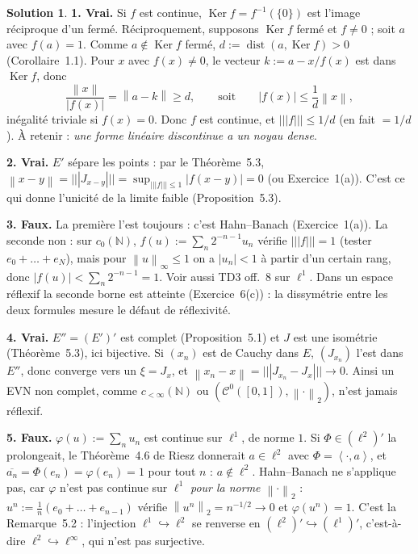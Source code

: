 \documentclass[11pt,a4paper]{article}
\newcommand{\N}{\mathbb{N}}
\newcommand{\dist}{\operatorname{dist}}
\newcommand{\norm}[1]{\left\|#1\right\|}
\newcommand{\opnorm}[1]{|\!|\!|#1|\!|\!|}
\newcommand{\ps}[2]{\left\langle #1,#2\right\rangle}
\newcommand{\Cz}{\mathcal{C}^0}
\newcommand{\ie}{c'est-à-dire}
\DeclareMathOperator{\Ker}{Ker}
\theoremstyle{definition}
\newtheorem*{solution}{Solution}
\begin{document}
\begin{solution}
\noindent\textbf{1. Vrai.} Si $f$ est continue, $\Ker f=f^{-1}(\{0\})$ est l'image réciproque d'un fermé. Réciproquement, supposons $\Ker f$ fermé et $f\ne0$ ; soit $a$ avec $f(a)=1$. Comme $a\notin\Ker f$ fermé, $d:=\dist(a,\Ker f)>0$ (Corollaire~1.1). Pour $x$ avec $f(x)\ne0$, le vecteur $k:=a-x/f(x)$ est dans $\Ker f$, donc
\[
\frac{\norm x}{|f(x)|}=\norm{a-k}\ge d,\qquad\text{soit}\qquad|f(x)|\le\frac1d\norm x ,
\]
inégalité triviale si $f(x)=0$. Donc $f$ est continue, et $\opnorm f\le1/d$ (en fait $=1/d$). À retenir : \emph{une forme linéaire discontinue a un noyau dense}.

\medskip
\noindent\textbf{2. Vrai.} $E'$ sépare les points : par le Théorème~5.3, $\norm{x-y}=\opnorm{J_{x-y}}=\sup_{\opnorm f\le1}|f(x-y)|=0$ (ou Exercice~1(a)). C'est ce qui donne l'unicité de la limite faible (Proposition~5.3).

\medskip
\noindent\textbf{3. Faux.} La première l'est toujours : c'est Hahn--Banach (Exercice~1(a)). La seconde non : sur $c_0(\N)$, $f(u):=\sum_n2^{-n-1}u_n$ vérifie $\opnorm f=1$ (tester $e_0+\dots+e_N$), mais pour $\norm u_\infty\le1$ on a $|u_n|<1$ à partir d'un certain rang, donc $|f(u)|<\sum_n2^{-n-1}=1$. Voir aussi TD3 off.~8 sur $\ell^1$. Dans un espace réflexif la seconde borne est atteinte (Exercice~6(c)) : la dissymétrie entre les deux formules mesure le défaut de réflexivité.

\medskip
\noindent\textbf{4. Vrai.} $E''=(E')'$ est complet (Proposition~5.1) et $J$ est une isométrie (Théorème~5.3), ici bijective. Si $(x_n)$ est de Cauchy dans $E$, $(J_{x_n})$ l'est dans $E''$, donc converge vers un $\xi=J_x$, et $\norm{x_n-x}=\opnorm{J_{x_n}-J_x}\to0$. Ainsi un EVN non complet, comme $c_{<\infty}(\N)$ ou $(\Cz([0,1]),\norm\cdot_2)$, n'est jamais réflexif.

\medskip
\noindent\textbf{5. Faux.} $\varphi(u):=\sum_nu_n$ est continue sur $\ell^1$, de norme $1$. Si $\Phi\in(\ell^2)'$ la prolongeait, le Théorème~4.6 de Riesz donnerait $a\in\ell^2$ avec $\Phi=\ps\cdot a$, et $\overline{a_n}=\Phi(e_n)=\varphi(e_n)=1$ pour tout $n$ : $a\notin\ell^2$. Hahn--Banach ne s'applique pas, car $\varphi$ n'est pas continue sur $\ell^1$ \emph{pour la norme $\norm\cdot_2$} : $u^n:=\frac1n(e_0+\dots+e_{n-1})$ vérifie $\norm{u^n}_2=n^{-1/2}\to0$ et $\varphi(u^n)=1$. C'est la Remarque~5.2 : l'injection $\ell^1\hookrightarrow\ell^2$ se renverse en $(\ell^2)'\hookrightarrow(\ell^1)'$, \ie{} $\ell^2\hookrightarrow\ell^\infty$, qui n'est pas surjective.


\end{solution}
\end{document}

